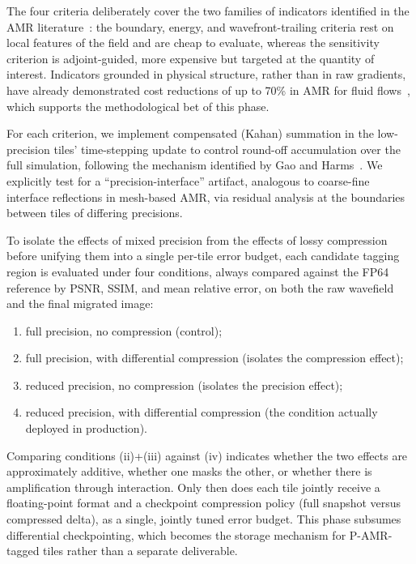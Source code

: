 \documentclass[12pt,a4paper]{article}
\newcommand{\pamr}{P\nobreakdash-AMR}
\begin{document}
The four criteria deliberately cover the two families of indicators
identified in the AMR literature~\cite{vivarelli2025review}: the boundary,
energy, and wavefront-trailing criteria rest on local features of the field
and are cheap to evaluate, whereas the sensitivity criterion is
adjoint-guided, more expensive but targeted at the quantity of interest.
Indicators grounded in physical structure, rather than in raw gradients,
have already demonstrated cost reductions of up to 70\% in AMR for
fluid flows~\cite{kumar2025dominant}, which supports the methodological bet
of this phase.

For each criterion, we implement compensated (Kahan) summation in the
low-precision tiles' time-stepping update to control round-off
accumulation over the full simulation, following the mechanism identified
by Gao and Harms~\cite{gao2023half}. We explicitly test for a
``precision-interface'' artifact, analogous to coarse-fine interface
reflections in mesh-based AMR, via residual analysis at the boundaries
between tiles of differing precisions.

To isolate the effects of mixed precision from the effects of lossy
compression before unifying them into a single per-tile error budget, each
candidate tagging region is evaluated under four conditions, always
compared against the FP64 reference by PSNR, SSIM, and mean relative
error, on both the raw wavefield and the final migrated image:

\begin{enumerate}
  \item full precision, no compression (control);
  \item full precision, with differential compression (isolates the
        compression effect);
  \item reduced precision, no compression (isolates the precision
        effect);
  \item reduced precision, with differential compression (the condition
        actually deployed in production).
\end{enumerate}

Comparing conditions (ii)+(iii) against (iv) indicates whether the two
effects are approximately additive, whether one masks the other, or
whether there is amplification through interaction. Only then does each
tile jointly receive a floating-point format and a checkpoint compression
policy (full snapshot versus compressed delta), as a single, jointly
tuned error budget. This phase subsumes differential checkpointing, which
becomes the storage mechanism for \pamr{}-tagged tiles rather than a
separate deliverable.
\end{document}
